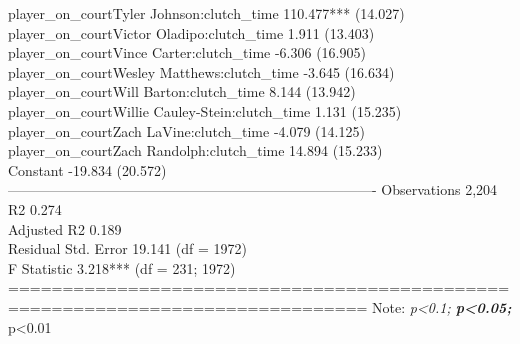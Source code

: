 \documentclass[
  landscape]{article}
\begin{document}
player\_on\_courtTyler Johnson:clutch\_time 110.477*** (14.027)\\
player\_on\_courtVictor Oladipo:clutch\_time 1.911 (13.403)\\
player\_on\_courtVince Carter:clutch\_time -6.306 (16.905)\\
player\_on\_courtWesley Matthews:clutch\_time -3.645 (16.634)\\
player\_on\_courtWill Barton:clutch\_time 8.144 (13.942)\\
player\_on\_courtWillie Cauley-Stein:clutch\_time 1.131 (15.235)\\
player\_on\_courtZach LaVine:clutch\_time -4.079 (14.125)\\
player\_on\_courtZach Randolph:clutch\_time 14.894 (15.233)\\
Constant -19.834 (20.572)\\
-------------------------------------------------------------------------------
Observations 2,204\\
R2 0.274\\
Adjusted R2 0.189\\
Residual Std. Error 19.141 (df = 1972)\\
F Statistic 3.218*** (df = 231; 1972)
===============================================================================
Note: \emph{p\textless0.1; \textbf{p\textless0.05; }}p\textless0.01
\end{document}
